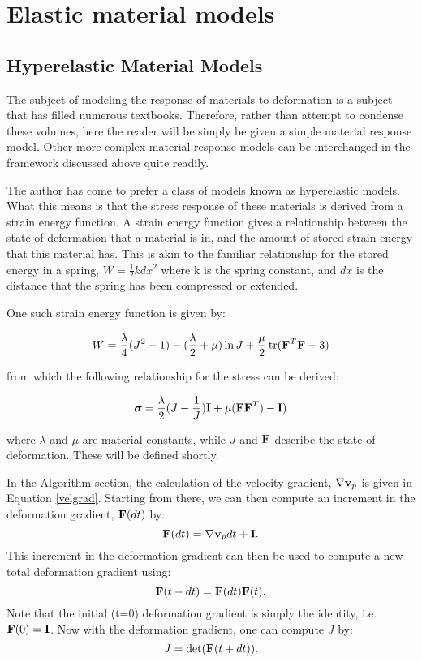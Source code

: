 
\chapter{Elastic material models}
\section{Hyperelastic Material Models}

The subject of modeling the response of materials to deformation 
is a subject that has filled numerous textbooks.  Therefore, 
rather than attempt to condense these volumes, here the reader 
will be simply be given a simple material response model.  Other 
more complex material response models can be interchanged in the 
framework discussed above quite readily.

The author has come to prefer a class of models known as 
hyperelastic models.  What this means is that the stress 
response of these materials is derived from a strain energy 
function.  A strain energy function gives a relationship between 
the state of deformation that a material is in, and the amount 
of stored strain energy that this material has.  This is akin to 
the familiar relationship for the stored energy in a spring, 
$W=\frac{1}{2} k dx^2$ where k is the spring constant, and $dx$ is
the distance that the spring has been compressed or extended.

One such strain energy function is given by:

\begin{equation}
	W = \frac{\lambda}{4}(J^2-1)
 - (\frac{\lambda}{2}+\mu) \ln J
+ \frac{\mu}{2}\,\text{tr}(\mbox{\ensuremath{\mathbf{F}}}^T\mbox{\ensuremath{\mathbf{F}}} - 3)
\end{equation}

from which the following relationship for the stress can be 
derived:

\begin{equation}
       \mbox{\boldmath $\sigma \!\!$ \unboldmath} = \frac{\lambda}{2}(J-\frac{1}{J})\mbox{\ensuremath{\mathbf{I}}} 
  + \mu (\mbox{\ensuremath{\mathbf{F}}}\mbox{\ensuremath{\mathbf{F}}}^T) - \mbox{\ensuremath{\mathbf{I}}})
 \label{stress}
\end{equation}

where $\lambda$ and $\mu$ are material constants, while $J$ and 
$\mbox{\ensuremath{\mathbf{F}}}$ describe the state of deformation.  These will be 
defined shortly.

In the Algorithm section, the calculation of the velocity 
gradient, $\nabla \mbox{\ensuremath{\mathbf{v}}}_p$ is given in Equation \ref{velgrad}.
Starting from there, we can then compute an increment in the 
deformation gradient, $\mbox{\ensuremath{\mathbf{F}}}(dt)$ by:
\begin{equation}
	\mbox{\ensuremath{\mathbf{F}}}(dt) = \nabla \mbox{\ensuremath{\mathbf{v}}}_p dt + \mbox{\ensuremath{\mathbf{I}}}.
\end{equation}
This increment in the deformation gradient can then be used to 
compute a new total deformation gradient using:
\begin{equation}
	\mbox{\ensuremath{\mathbf{F}}}(t+dt) = \mbox{\ensuremath{\mathbf{F}}}(dt) \mbox{\ensuremath{\mathbf{F}}}(t).
\end{equation}
Note that the initial (t=0) deformation gradient is simply the 
identity, i.e. $\mbox{\ensuremath{\mathbf{F}}}(0) = \mbox{\ensuremath{\mathbf{I}}}$.  Now with the deformation 
gradient, one can compute $J$ by:
\begin{equation}
	J = \det(\mbox{\ensuremath{\mathbf{F}}}(t+dt)).
\end{equation}

